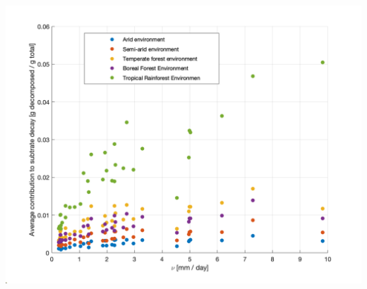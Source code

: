 \documentclass[12pt]{article}
\begin{document}
\begin{center}
\includegraphics[width=\linewidth]{avg_contr_nu_environment.png}
\label{Fig 2.}
\end{center}
\end{document}
